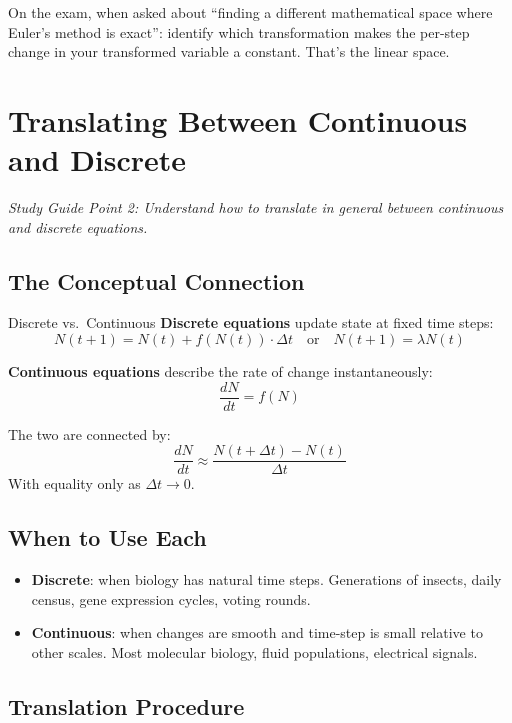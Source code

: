 \documentclass[11pt]{article}
\begin{document}
\begin{tipbox}
On the exam, when asked about ``finding a different mathematical space where Euler's method is exact'': identify which transformation makes the per-step change in your transformed variable a constant. That's the linear space.
\end{tipbox}

\section{Translating Between Continuous and Discrete}

\textit{Study Guide Point 2: Understand how to translate in general between continuous and discrete equations.}

\subsection{The Conceptual Connection}

\begin{conceptbox}{Discrete vs.\ Continuous}
\textbf{Discrete equations} update state at fixed time steps:
\[
N(t+1) = N(t) + f(N(t))\cdot \Delta t \quad\text{or}\quad N(t+1) = \lambda N(t)
\]

\textbf{Continuous equations} describe the rate of change instantaneously:
\[
\frac{dN}{dt} = f(N)
\]

The two are connected by:
\[
\frac{dN}{dt} \approx \frac{N(t+\Delta t) - N(t)}{\Delta t}
\]
With equality only as $\Delta t \to 0$.
\end{conceptbox}

\subsection{When to Use Each}

\begin{itemize}
\item \textbf{Discrete}: when biology has natural time steps. Generations of insects, daily census, gene expression cycles, voting rounds.
\item \textbf{Continuous}: when changes are smooth and time-step is small relative to other scales. Most molecular biology, fluid populations, electrical signals.
\end{itemize}

\subsection{Translation Procedure}
\end{document}
